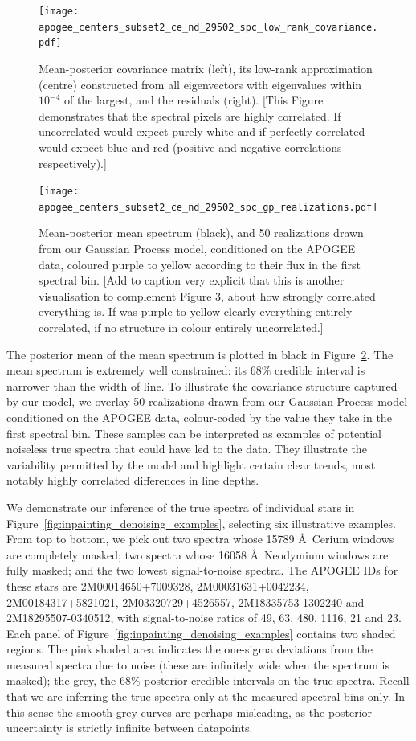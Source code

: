 \documentclass[a4paper,fleqn,usenatbib]{mnras}
\begin{document}
\begin{figure}
	\texttt{[image: apogee\_centers\_subset2\_ce\_nd\_29502\_spc\_low\_rank\_covariance.pdf]}
    \caption{Mean-posterior covariance matrix (left), its low-rank approximation (centre) constructed from all eigenvectors with eigenvalues within $10^{-4}$ of the largest, and the residuals (right). [This Figure demonstrates that the spectral pixels are highly correlated. If uncorrelated would expect purely white and if perfectly correlated would expect blue and red (positive and negative correlations respectively).]}
    \label{fig:inferred_cov}
\end{figure}

\begin{figure}
	\texttt{[image: apogee\_centers\_subset2\_ce\_nd\_29502\_spc\_gp\_realizations.pdf]}
    \caption{Mean-posterior mean spectrum (black), and 50 realizations drawn from our Gaussian Process model, conditioned on the APOGEE data, coloured purple to yellow according to their flux in the first spectral bin. [Add to caption very explicit that this is another visualisation to complement Figure 3, about how strongly correlated everything is. If was purple to yellow clearly everything entirely correlated, if no structure in colour entirely uncorrelated.]  }
    \label{fig:gp_reals}
\end{figure}

The posterior mean of the mean spectrum is plotted in black in Figure~\ref{fig:gp_reals}. The mean spectrum is extremely well constrained: its 68\% credible interval is narrower than the width of line. To illustrate the covariance structure captured by our model, we overlay 50 realizations drawn from our Gaussian-Process model conditioned on the APOGEE data, colour-coded by the value they take in the first spectral bin. These samples can be interpreted as examples of potential noiseless true spectra that could have led to the data. They illustrate the variability permitted by the model and highlight certain clear trends, most notably highly correlated differences in line depths.

We demonstrate our inference of the true spectra of individual stars in Figure~\ref{fig:inpainting_denoising_examples}, selecting six illustrative examples. From top to bottom, we pick out two spectra whose 15789 \AA\ Cerium windows are completely masked; two spectra whose 16058 \AA\ Neodymium windows are fully masked; and the two lowest signal-to-noise spectra. The APOGEE IDs for these stars are 2M00014650+7009328, 2M00031631+0042234, 2M00184317+5821021, 2M03320729+4526557, 2M18335753-1302240 and 2M18295507-0340512, with signal-to-noise ratios of 49, 63, 480, 1116, 21 and 23. Each panel of Figure~\ref{fig:inpainting_denoising_examples} contains two shaded regions. The pink shaded area indicates the one-sigma deviations from the measured spectra due to noise (these are infinitely wide when the spectrum is masked); the grey, the 68\% posterior credible intervals on the true spectra. Recall that we are inferring the true spectra only at the measured spectral bins only. In this sense the smooth grey curves are perhaps misleading, as the posterior uncertainty is strictly infinite between datapoints.
 
\end{document}

